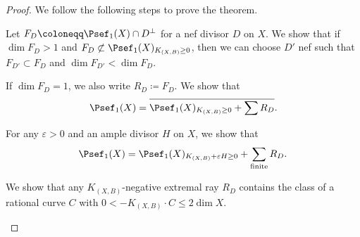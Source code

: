     \begin{proof}
        We follow the following steps to prove the theorem.
        \begin{step}\label{step1:thm:cone_theorem}
            Let \(F_D \coloneqq \Psef_1(X) \cap D^\perp\) for a nef divisor \(D\) on \(X\).
            We show that if \(\dim F_D > 1\) and \(F_D \not\subset \Psef_1(X)_{K_{(X,B)} \geq 0}\), then we can choose \(D'\) nef such that \(F_{D'} \subset F_{D}\) and \(\dim F_{D'} < \dim F_D\).
        \end{step}

        \begin{step}
            If \(\dim F_D = 1\), we also write \(R_D \coloneqq F_D\).
            We show that 
            \[ \Psef_1(X) = \overline{ \Psef_1(X)_{K_{(X,B)} \geq 0} + \sum R_D }. \]
        \end{step}

        \begin{step}
            For any \(\varepsilon > 0\) and an ample divisor \(H\) on \(X\), we show that
            \[ \Psef_1(X) = \Psef_1(X)_{K_{(X,B)}+\varepsilon H \geq 0} + \sum_{\text{finite}} R_D . \]
        \end{step}

        \begin{step}
            We show that any \(K_{(X,B)}\)-negative extremal ray \(R_D\) contains the class of a rational curve \(C\) with \(0 < -K_{(X,B)} \cdot C \leq 2 \dim X\).
        \end{step}

    \end{proof}


